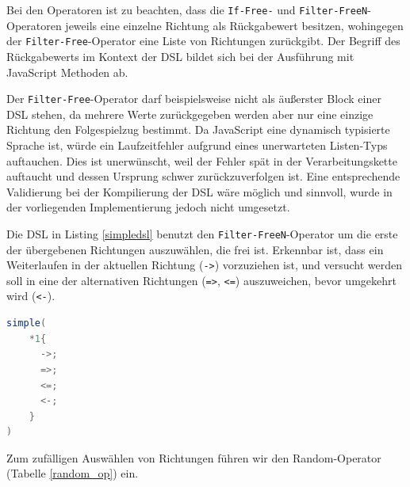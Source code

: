 \documentclass[conference]{IEEEtran}
\begin{document}
Bei den Operatoren ist zu beachten, dass die \texttt{If-Free-} und \texttt{Filter-FreeN}-Operatoren jeweils eine einzelne Richtung als Rückgabewert besitzen, wohingegen der \texttt{Filter-Free}-Operator eine Liste von Richtungen zurückgibt. Der Begriff des Rückgabewerts im Kontext der DSL bildet sich bei der Ausführung mit JavaScript Methoden ab.

Der \texttt{Filter-Free}-Operator darf beispielsweise nicht als äußerster Block einer DSL stehen, da mehrere Werte zurückgegeben werden aber nur eine einzige Richtung den Folgespielzug bestimmt. Da JavaScript eine dynamisch typisierte Sprache ist, würde ein Laufzeitfehler aufgrund eines unerwarteten Listen-Typs auftauchen. Dies ist unerwünscht, weil der Fehler spät in der Verarbeitungskette auftaucht und dessen Ursprung schwer zurückzuverfolgen ist. Eine entsprechende Validierung bei der Kompilierung der DSL wäre möglich und sinnvoll, wurde in der vorliegenden Implementierung jedoch nicht umgesetzt.

Die DSL in Listing \ref{simpledsl} benutzt den \texttt{Filter-FreeN}-Operator um die erste der übergebenen Richtungen auszuwählen, die frei ist. Erkennbar ist, dass ein Weiterlaufen in der aktuellen Richtung (\texttt{->}) vorzuziehen ist, und versucht werden soll in eine der alternativen Richtungen (\texttt{=>}, \texttt{<=}) auszuweichen, bevor umgekehrt wird (\texttt{<-}).


\begin{lstlisting}[language=Java, captionpos=b, caption=AI DSL mit F\texttt{Filter-FreeN}-Operator, label=simpledsl]
simple(
    *1{
      ->;
      =>;
      <=;
      <-;
    }
)
\end{lstlisting}

Zum zufälligen Auswählen von Richtungen führen wir den Random-Operator (Tabelle \ref{random_op}) ein.
\end{document}
